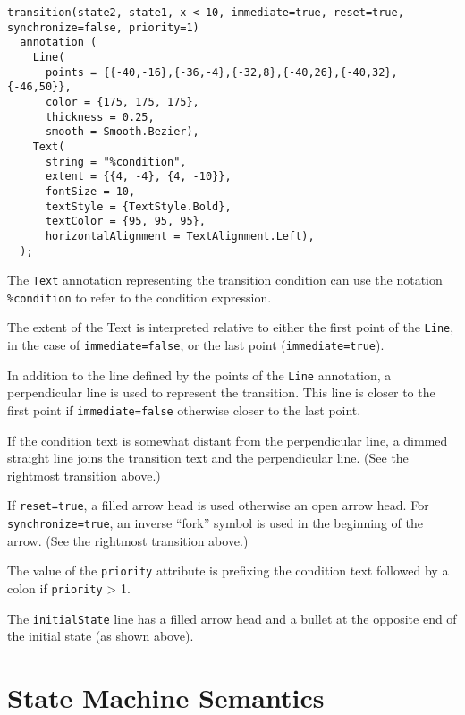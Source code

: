 \begin{example}
\begin{lstlisting}[language=modelica]
transition(state2, state1, x < 10, immediate=true, reset=true, synchronize=false, priority=1)
  annotation (
    Line(
      points = {{-40,-16},{-36,-4},{-32,8},{-40,26},{-40,32},{-46,50}},
      color = {175, 175, 175},
      thickness = 0.25,
      smooth = Smooth.Bezier),
    Text(
      string = "%condition",
      extent = {{4, -4}, {4, -10}},
      fontSize = 10,
      textStyle = {TextStyle.Bold},
      textColor = {95, 95, 95},
      horizontalAlignment = TextAlignment.Left),
  );
\end{lstlisting}
\end{example}

The \lstinline!Text! annotation representing the transition condition can use the notation \lstinline!%condition! to refer to the condition expression.

The extent of the Text is interpreted relative to either the first point of the \lstinline!Line!, in the case of \lstinline!immediate=false!, or the last point (\lstinline!immediate=true!).

In addition to the line defined by the points of the \lstinline!Line! annotation, a perpendicular line is used to represent the transition.  This line is closer to the first point if \lstinline!immediate=false! otherwise closer to the last point.

If the condition text is somewhat distant from the perpendicular line, a dimmed straight line joins the transition text and the perpendicular line.  (See the rightmost transition above.)

If \lstinline!reset=true!, a filled arrow head is used otherwise an open arrow head.
For \lstinline!synchronize=true!, an inverse ``fork'' symbol is used in the
beginning of the arrow.  (See the rightmost transition above.)

The value of the \lstinline!priority! attribute is prefixing the condition text
followed by a colon if \lstinline!priority! \textgreater{} 1.

The \lstinline!initialState! line has a filled arrow head and a bullet at the
opposite end of the initial state (as shown above).

\section{State Machine Semantics}\label{state-machine-semantics}

